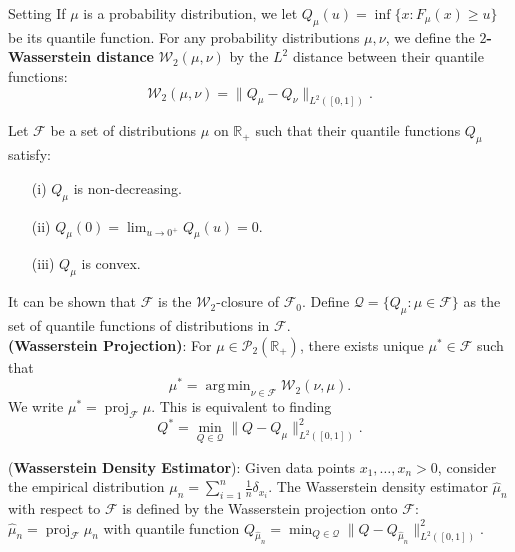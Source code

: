 \documentclass[final]{beamer}
\DeclareMathOperator*{\argmin}{arg\,min}
\DeclareMathOperator{\proj}{proj}
\newlength{\colwidth}
\begin{document}
\begin{frame}[t]
\begin{columns}[t]
\begin{column}{\colwidth}
\begin{block}{Setting}
If $\mu$ is a probability distribution, we let $ Q_{\mu}(u) = \inf\{ x : F_{\mu}(x) \geq u \}$ be its quantile function. For any probability distributions $\mu,\nu$, we define the \textbf{$2$-Wasserstein distance} $\mathcal{W}_2(\mu, \nu)$ by the $L^2$ distance between their quantile functions: 
\begin{equation*}
\mathcal{W}_2(\mu, \nu) = \| Q_{\mu} - Q_{\nu} \|_{L^2([0, 1])}.
\end{equation*}

Let $\mathcal{F}$ be a set of distributions $\mu$ on $\mathbb{R}_+$ such that their quantile functions $Q_{\mu}$ satisfy:
\vspace{-1.5cm}
\begin{itemize}
\item[(i)] $Q_{\mu}$ is non-decreasing.
\item[(ii)] $Q_{\mu}(0) = \lim_{u \rightarrow 0^+} Q_{\mu}(u) = 0$.
\item[(iii)] $Q_{\mu}$ is convex.
\end{itemize}
It can be shown that $\mathcal{F}$ is the $\mathcal{W}_2$-closure of $\mathcal{F}_0$. Define $\mathcal{Q} = \{Q_{\mu} : \mu \in \mathcal{F}\}$ as the set of quantile functions of distributions in $\mathcal{F}$. \\
\vspace{1cm}
\textbf{(Wasserstein Projection)}: For $\mu \in \mathcal{P}_2(\mathbb{R}_+)$, there exists unique $\mu^* \in \mathcal{F}$ such that 
\begin{equation*} %
\mu^* = \argmin_{\nu \in \mathcal{F}} \mathcal{W}_2(\nu, \mu). 
\end{equation*}
We write $\mu^* = \proj_{\mathcal{F}} \mu$. This is equivalent to finding
\begin{equation*}
Q^* = \min_{Q \in \mathcal{Q}} \| Q - Q_{\mu} \|_{L^2([0, 1])}^2.
\end{equation*}

(\textbf{Wasserstein Density Estimator}): Given data points $x_1, \ldots, x_n > 0$, consider the empirical distribution $\mu_n = \sum_{i = 1}^n \frac{1}{n} \delta_{x_i}$. The Wasserstein density estimator $\hat{\mu}_n$ with respect to $\mathcal{F}$ is defined by the Wasserstein projection onto $\mathcal{F}$:\\
\vspace{1cm}
\centering$\hat{\mu}_n = \proj_{\mathcal{F}} \mu_n$ with quantile function $Q_{\hat{\mu}_n} = \min_{Q \in \mathcal{Q}} \| Q - Q_{\hat{\mu}_n}\|_{L^2([0, 1])}^2$. 






\end{block}
\end{column}
\end{columns}
\end{frame}
\end{document}
